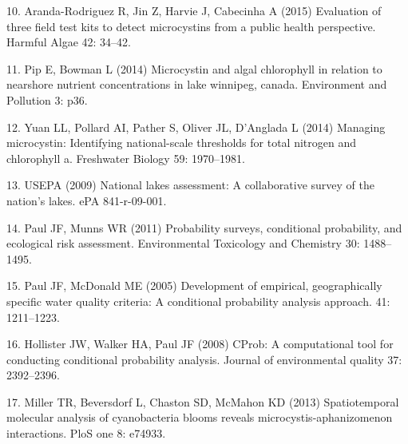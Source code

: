 \documentclass[10pt,a4paper,twocolumn]{article}
\begin{document}
10. Aranda-Rodriguez R, Jin Z, Harvie J, Cabecinha A (2015) Evaluation
of three field test kits to detect microcystins from a public health
perspective. Harmful Algae 42: 34--42.

11. Pip E, Bowman L (2014) Microcystin and algal chlorophyll in relation
to nearshore nutrient concentrations in lake winnipeg, canada.
Environment and Pollution 3: p36.

12. Yuan LL, Pollard AI, Pather S, Oliver JL, D'Anglada L (2014)
Managing microcystin: Identifying national-scale thresholds for total
nitrogen and chlorophyll a. Freshwater Biology 59: 1970--1981.

13. USEPA (2009) National lakes assessment: A collaborative survey of
the nation's lakes. ePA 841-r-09-001.

14. Paul JF, Munns WR (2011) Probability surveys, conditional
probability, and ecological risk assessment. Environmental Toxicology
and Chemistry 30: 1488--1495.

15. Paul JF, McDonald ME (2005) Development of empirical, geographically
specific water quality criteria: A conditional probability analysis
approach. 41: 1211--1223.

16. Hollister JW, Walker HA, Paul JF (2008) CProb: A computational tool
for conducting conditional probability analysis. Journal of
environmental quality 37: 2392--2396.

17. Miller TR, Beversdorf L, Chaston SD, McMahon KD (2013)
Spatiotemporal molecular analysis of cyanobacteria blooms reveals
microcystis-aphanizomenon interactions. PloS one 8: e74933.
\end{document}
